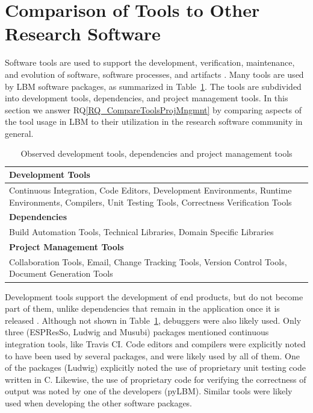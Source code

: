 \documentclass[runningheads]{llncs}
\newcommand{\rqref}[1]{RQ\ref{#1}}
\begin{document}
\section{Comparison of Tools to Other Research Software}
\label{Sec_CompareTools}

Software tools are used to support the development, verification, maintenance,
and evolution of software, software processes, and artifacts \cite[p.\
501]{GhezziEtAl2003}. Many tools are used by LBM software packages, as
summarized in Table~\ref{tbl_tools}.  The tools are subdivided into development
tools, dependencies, and project management tools.  In this section we answer
\rqref{RQ_CompareToolsProjMngmnt} by comparing aspects of the tool usage in LBM
to their utilization in the research software community in general.

\begin{table}[h!]
\begin{center}
\begin{tabular}{ p{12 cm}}
\textbf{Development Tools}\\
\midrule
Continuous Integration, Code Editors, Development Environments, Runtime
Environments, Compilers, Unit Testing Tools, Correctness Verification Tools\\
\textbf{Dependencies}\\
\midrule
Build Automation Tools, Technical Libraries, Domain Specific Libraries\\
\textbf{Project Management Tools}\\
\midrule
Collaboration Tools, Email, Change Tracking Tools, Version Control Tools, Document Generation Tools\\
\end{tabular}
\caption{Observed development tools, dependencies and project management tools} 
\label{tbl_tools}
\end{center}
\end{table}
	
Development tools support the development of end products, but do not become
part of them, unlike dependencies that remain in the application once it is
released \cite[p.\ 506]{GhezziEtAl2003}. Although not shown in
Table~\ref{tbl_tools}, debuggers were also likely used.  Only three (ESPResSo,
Ludwig and Musubi) packages mentioned continuous integration tools, like Travis
CI. Code editors and compilers were explicitly noted to have been used by
several packages, and were likely used by all of them. One of the packages
(Ludwig) explicitly noted the use of proprietary unit testing code written in C.
Likewise, the use of proprietary code for verifying the correctness of output
was noted by one of the developers (pyLBM). Similar tools were likely used when
developing the other software packages.
\end{document}
